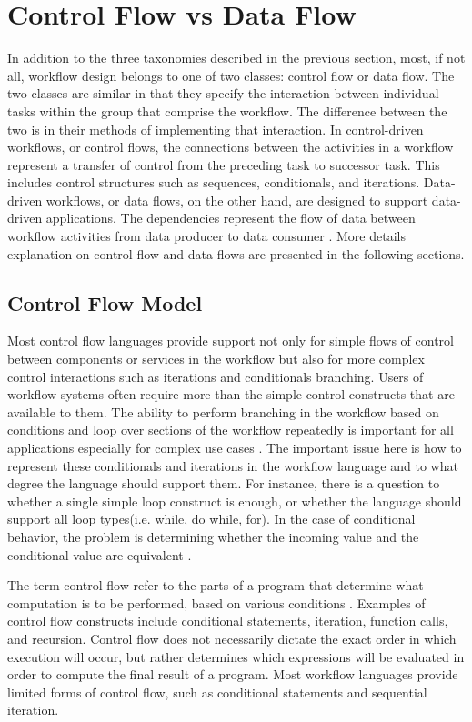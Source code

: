 \section{Control Flow vs Data Flow}
In addition to the three taxonomies described in the previous section, most, if not all, workflow design belongs to one of two classes: control flow or data flow. The two classes are similar in that they specify the interaction between individual tasks within the group that comprise the workflow. The difference between the two is in their methods of implementing that interaction. In control-driven workflows, or control flows, the connections between the activities in a workflow represent a transfer of control from the preceding task to successor task. This includes control structures such as sequences, conditionals, and iterations. Data-driven workflows, or data flows, on the other hand, are designed to support data-driven applications. The dependencies represent the flow of data between workflow activities from data producer to data consumer \cite{deelman2009workflows}. More details explanation on control flow and data flows are presented in the following sections. 

\subsection{Control Flow Model}\label{ch1:opts}
Most control flow languages provide support not only for simple flows of control between components or services in the workflow but also for more complex control interactions such as iterations and conditionals branching. Users of workflow systems often require more than the simple control constructs that are available to them. The ability to perform branching in the workflow based on conditions and loop over sections of the workflow repeatedly is important for all applications especially for complex use cases \cite{deelman2009workflows}. The important issue here is how to represent these conditionals and iterations in the workflow language and to what degree the language should support them. For instance, there is a question to whether a single simple loop construct is  enough, or whether the language should support all loop types(i.e. while, do while, for). In the case of conditional behavior, the problem is determining whether the incoming value and the conditional value are equivalent \cite{deelman2009workflows}.

The term control flow refer to the parts of a program that determine what computation is to be performed, based on various conditions \cite{kelly2011applying}. Examples of control flow constructs include conditional statements, iteration, function calls, and recursion. Control flow does not necessarily dictate the exact order in which execution will occur, but rather determines which expressions will be evaluated in order to compute the final result of a program. Most workflow languages provide limited forms of control flow, such as conditional statements and sequential iteration.

